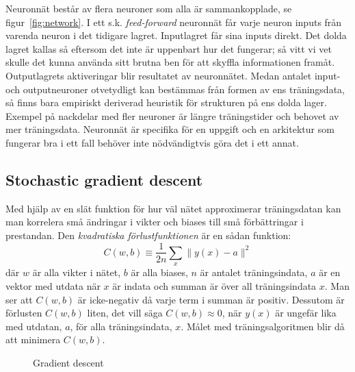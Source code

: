Neuronnät består av flera neuroner som alla är sammankopplade, se figur~\ref{fig:network}.
I ett s.k. \textit{feed-forward} neuronnät får varje neuron inputs från
varenda neuron i det tidigare lagret.
Inputlagret får sina inputs direkt.
Det dolda lagret kallas så eftersom det inte är uppenbart hur det fungerar;
så vitt vi vet skulle det kunna använda sitt brutna ben
för att skyffla informationen framåt.
Outputlagrets aktiveringar blir resultatet av neuronnätet.
Medan antalet input- och outputneuroner otvetydligt kan bestämmas
från formen av ens träningsdata,
så finns bara empiriskt deriverad heuristik för strukturen på ens dolda lager.
Exempel på nackdelar med fler neuroner är längre träningstider
och behovet av mer träningsdata.
Neuronnät är specifika för en uppgift och en arkitektur som
fungerar bra i ett fall behöver inte nödvändigtvis göra det i ett annat.
\autocite{nielsen15}

\subsection{Stochastic gradient descent}
Med hjälp av en slät funktion för hur väl nätet approximerar träningsdatan
kan man korrelera små ändringar i vikter och biases
till små förbättringar i prestandan.
Den \emph{kvadratiska förlustfunktionen} är en sådan funktion:
\begin{equation} \label{eq:cost}
	C(w, b) \equiv \frac{1}{2n} \displaystyle\sum_x \lVert y(x) - a \rVert^2
\end{equation}
där $ w $ är alla vikter i nätet, $ b $ är alla biases,
$ n $ är antalet träningsindata, $ a $ är en vektor med utdata när $ x $ är indata
och summan är över all träningsindata $ x $.
Man ser att $ C(w, b) $ är icke-negativ då varje term i summan är positiv.
Dessutom är förlusten $ C(w, b) $ liten, det vill säga $ C(w, b) \approx 0 $,
när $ y(x) $ är ungefär lika med utdatan, $ a $, för alla träningsindata, $ x $.
Målet med träningsalgoritmen blir då att minimera $ C(w, b) $.

\begin{figure}
	\centering
	\caption{Gradient descent}
	\label{fig:descent}
\end{figure}

